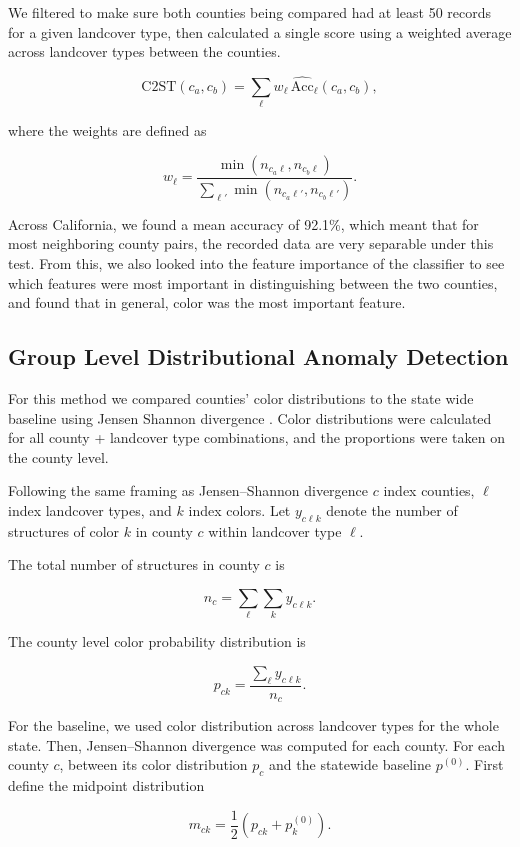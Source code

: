 \documentclass[11pt,letterpaper]{article}
\begin{document}
We filtered to make sure both counties being compared had at least 50 records for a given landcover type, then calculated a single score using a weighted average across landcover types between the counties. 

\[
\text{C2ST}(c_a, c_b)
=
\sum_{\ell}
w_\ell \, \widehat{\text{Acc}}_\ell(c_a, c_b),
\]

where the weights are defined as

\[
w_\ell
=
\frac{\min(n_{c_a\ell}, n_{c_b\ell})}
{\sum_{\ell'} \min(n_{c_a\ell'}, n_{c_b\ell'})}.
\]


Across California, we found a mean accuracy of 92.1\%, which meant that for most neighboring county pairs, the recorded data are very separable under this test. From this, we also looked into the feature importance of the classifier to see which features were most important in distinguishing between the two counties, and found that in general, color was the most important feature.

\subsection{Group Level Distributional Anomaly Detection}
For this method we compared counties’ color distributions to the state wide baseline using Jensen Shannon divergence \citep{scipy_jensenshannon}. Color distributions were calculated for all county + landcover type combinations, and the proportions were taken on the county level. 

Following the same framing as Jensen–Shannon divergence  $c$ index counties, $\ell$ index landcover types, and $k$ index colors.  
Let $y_{c\ell k}$ denote the number of structures of color $k$ in county $c$
within landcover type $\ell$.

The total number of structures in county $c$ is

\[
n_c = \sum_{\ell} \sum_k y_{c\ell k}.
\]

The county level color probability distribution is

\[
p_{ck}
=
\frac{\sum_{\ell} y_{c\ell k}}{n_c}.
\]


For the baseline, we used color distribution across landcover types for the whole state. Then, Jensen–Shannon divergence was computed \citep{scipy_jensenshannon} for each county. For each county $c$, between its color distribution $p_c$ and the statewide baseline $p^{(0)}$. First define the midpoint distribution

\[
m_{ck}
=
\frac{1}{2} \left( p_{ck} + p_k^{(0)} \right).
\]
\end{document}
